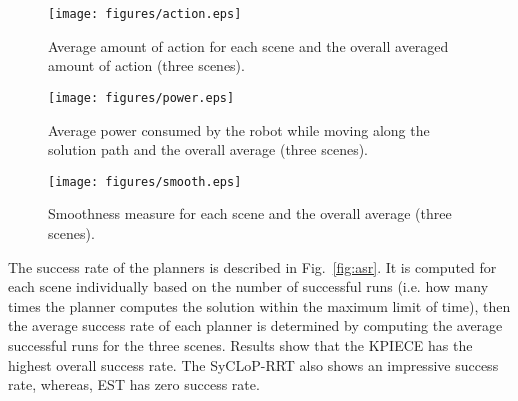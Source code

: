 \documentclass[runningheads,a4paper]{llncs}
\begin{document}
\begin{figure}[!ht]
\begin{center}
\texttt{[image: figures/action.eps]}%
\caption{Average amount of action for each scene and the overall averaged  amount of action (three scenes).} \label{fig:action}
\vspace{-6mm}
\end{center}
\end{figure}
\begin{figure}[!ht]
\begin{center}
\texttt{[image: figures/power.eps]}%
\caption{Average power consumed by the robot while moving along the solution path and the overall average (three scenes).} \label{fig:power}
\vspace{-5mm}
\end{center}
\end{figure}
\begin{figure}[!ht]
\begin{center}
\texttt{[image: figures/smooth.eps]}%
\caption{Smoothness measure for each scene and the overall average  (three scenes). } \label{fig:smooth}
\vspace{-4mm}
\end{center}
\end{figure}
The success rate of the planners is described in Fig.~\ref{fig:asr}. It is computed for each scene individually based on the number of successful runs (i.e. how many times the planner
computes the solution within the maximum limit of time), then
the average success rate of each planner is determined by computing the average successful runs for the three scenes. Results show that the KPIECE has the highest
overall success rate. The SyCLoP-RRT also shows an impressive success rate, whereas, EST has zero success rate.
\end{document}
